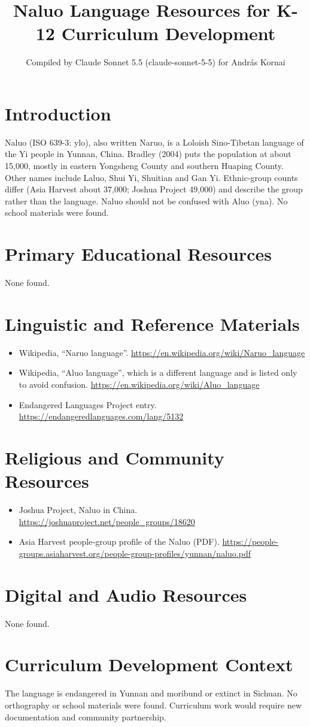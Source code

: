 \documentclass[12pt]{article}
\title{Naluo Language Resources for K-12 Curriculum Development}
\author{Compiled by Claude Sonnet 5.5 (claude-sonnet-5-5) for Andr\'as Kornai}
\date{}
\begin{document}
\maketitle

\section{Introduction}
Naluo (ISO 639-3: ylo), also written Naruo, is a Loloish Sino-Tibetan language of the Yi people in Yunnan, China. Bradley (2004) puts the population at about 15,000, mostly in eastern Yongsheng County and southern Huaping County. Other names include Laluo, Shui Yi, Shuitian and Gan Yi. Ethnic-group counts differ (Asia Harvest about 37,000; Joshua Project 49,000) and describe the group rather than the language. Naluo should not be confused with Aluo (yna). No school materials were found.

\section{Primary Educational Resources}
None found.

\section{Linguistic and Reference Materials}
\begin{itemize}
\item Wikipedia, ``Naruo language''. \url{https://en.wikipedia.org/wiki/Naruo_language}
\item Wikipedia, ``Aluo language'', which is a different language and is listed only to avoid confusion. \url{https://en.wikipedia.org/wiki/Aluo_language}
\item Endangered Languages Project entry. \url{https://endangeredlanguages.com/lang/5132}
\end{itemize}

\section{Religious and Community Resources}
\begin{itemize}
\item Joshua Project, Naluo in China. \url{https://joshuaproject.net/people_groups/18620}
\item Asia Harvest people-group profile of the Naluo (PDF). \url{https://people-groups.asiaharvest.org/people-group-profiles/yunnan/naluo.pdf}
\end{itemize}

\section{Digital and Audio Resources}
None found.

\section{Curriculum Development Context}
The language is endangered in Yunnan and moribund or extinct in Sichuan. No orthography or school materials were found. Curriculum work would require new documentation and community partnership.
\end{document}
